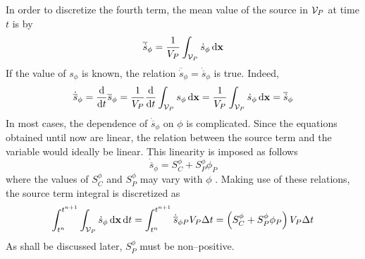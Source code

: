 In order to discretize the fourth term, the mean value of the source in $\mathcal{V}_{P}$ at time $t$ is by
\begin{equation}
	\overline{\dot{s}}_\phi = 
	\frac{1}{V_P} \int_{\mathcal{V}_{P}} \dot{s}_\phi \dd{\vb{x}}
\end{equation}
If the value of $s_\phi$ is known, the relation $\overline{\dot{s}}_\phi = \dot{\overline{s}}_\phi$ is true. Indeed,
\begin{equation}
	\dot{\overline{s}}_\phi = 
	\frac{\dd}{\dd{t}} \overline{s}_\phi = 
	\frac{1}{V_P} \frac{\dd}{\dd{t}} \int_{\mathcal{V}_{P}} s_\phi \dd{\vb{x}} = 
	\frac{1}{V_P} \int_{\mathcal{V}_{P}} \dot{s}_\phi \dd{\vb{x}} = 
	\overline{\dot{s}}_\phi
\end{equation}
In most cases, the dependence of $\dot{\overline{s}}_\phi$ on $\phi$ is complicated. Since the equations obtained until now are linear, the relation between the source term and the variable would ideally be linear. This linearity is imposed as follows
\begin{equation}
	\dot{\overline{s}}_\phi = S_C^\phi + S_P^\phi \phi_P
\end{equation}
where the values of $S_C^\phi$ and $S_P^\phi$ may vary with $\phi$ \cite{patankar2008numerical}. Making use of these relations, the source term integral is discretized as
\begin{equation}
	\int_{t^n}^{t^{n+1}} \int_{\mathcal{V}_{P}} \dot{s}_\phi \dd{\vb{x}} \dd{t} = 
	\int_{t^n}^{t^{n+1}} 
	\dot{\overline{s}}_{\phi P} V_P \Delta t = 
	\left( S_C^\phi + S_P^\phi \phi_P \right) V_P \Delta t
\end{equation}
As shall be discussed later, $S_P^\phi$ must be non--positive.

